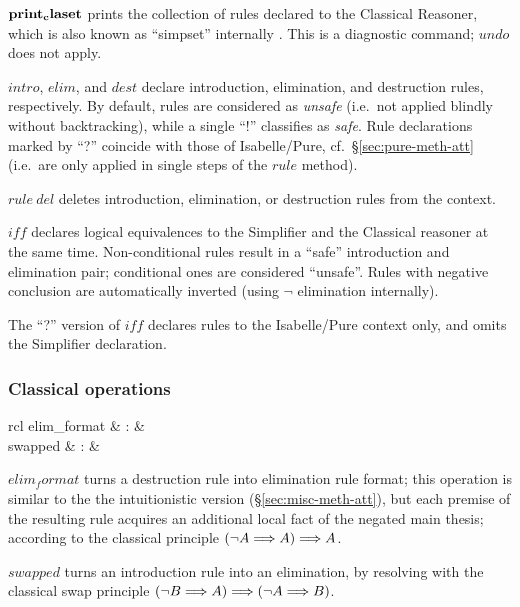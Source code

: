 \begin{descr}

\item [${\mathord{\mathbf{print_claset}}}$] prints the collection of rules declared to
  the Classical Reasoner, which is also known as ``simpset'' internally
  \cite{isabelle-ref}.  This is a diagnostic command; $undo$ does not apply.

\item [$intro$, $elim$, and $dest$] declare introduction, elimination, and
  destruction rules, respectively.  By default, rules are considered as
  \emph{unsafe} (i.e.\ not applied blindly without backtracking), while a
  single ``!'' classifies as \emph{safe}.  Rule declarations marked by ``?''
  coincide with those of Isabelle/Pure, cf.\ \S\ref{sec:pure-meth-att} (i.e.\
  are only applied in single steps of the $rule$ method).

\item [$rule~del$] deletes introduction, elimination, or destruction rules from
  the context.

\item [$iff$] declares logical equivalences to the Simplifier and the
  Classical reasoner at the same time.  Non-conditional rules result in a
  ``safe'' introduction and elimination pair; conditional ones are considered
  ``unsafe''.  Rules with negative conclusion are automatically inverted
  (using $\neg$ elimination internally).

  The ``?'' version of $iff$ declares rules to the Isabelle/Pure context only,
  and omits the Simplifier declaration.

\end{descr}


\subsubsection{Classical operations}\label{sec:classical-att}


\begin{matharray}{rcl}
  elim_format & : & \isaratt \\
  swapped & : & \isaratt \\
\end{matharray}

\begin{descr}

\item [$elim_format$] turns a destruction rule into elimination rule format;
  this operation is similar to the the intuitionistic version
  (\S\ref{sec:misc-meth-att}), but each premise of the resulting rule acquires
  an additional local fact of the negated main thesis; according to the
  classical principle $(\neg A \Longrightarrow A) \Longrightarrow A$.

\item [$swapped$] turns an introduction rule into an elimination, by resolving
  with the classical swap principle $(\neg B \Longrightarrow A) \Longrightarrow (\neg A \Longrightarrow B)$.

\end{descr}


